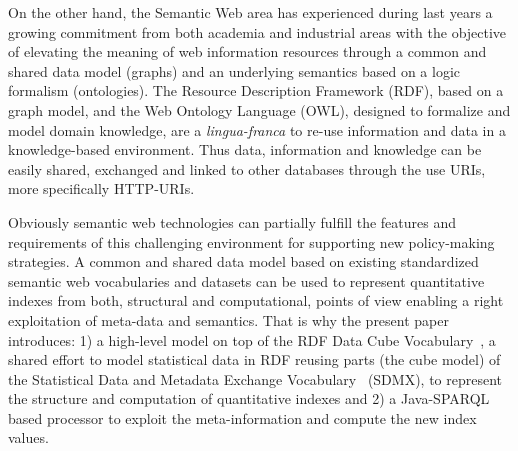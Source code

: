 On the other hand, the Semantic Web area has experienced during last years a growing commitment from both academia and industrial areas 
with the objective of elevating the meaning of web information resources through a common and shared data model (graphs) and 
an underlying semantics based on a logic formalism (ontologies). The Resource Description Framework (RDF), based on a graph model, 
and the Web Ontology Language (OWL), designed to formalize and model domain knowledge, are a \textit{lingua-franca} to re-use information 
and data in a knowledge-based environment. Thus data, information and knowledge can be easily shared, exchanged and linked 
to other databases through the use URIs, more specifically HTTP-URIs. 

Obviously semantic web technologies can partially fulfill the features and requirements of this challenging environment for supporting 
new policy-making strategies. A common and shared data model based on existing standardized semantic web vocabularies and datasets can be used to 
represent quantitative indexes from both, structural and computational, points of view enabling a right exploitation of meta-data and semantics. 
That is why the present paper introduces: 1) a high-level model on top of the RDF Data Cube Vocabulary~\cite{rdf-data-cube}, a shared effort to model statistical data in RDF reusing parts 
(the cube model) of the Statistical Data and Metadata Exchange Vocabulary~\cite{sdmx} (SDMX), to represent the structure and computation of quantitative indexes and 
2) a Java-SPARQL based processor to exploit the meta-information and compute the new index values.





